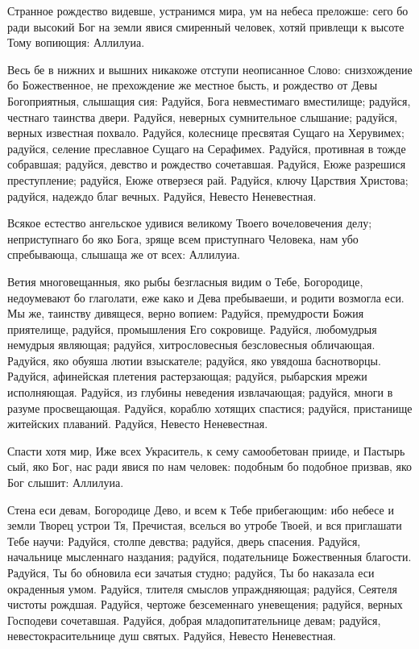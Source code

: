 

Странное рождество видевше, устранимся мира, ум на небеса преложше: сего бо ради высокий Бог на земли явися смиренный человек, хотяй привлещи к высоте Тому вопиющия: Аллилуиа.




Весь бе в нижних и вышних никакоже отступи неописанное Слово: снизхождение бо Божественное, не прехождение же местное бысть, и рождество от Девы Богоприятныя, слышащия сия: Радуйся, Бога невместимаго вместилище; радуйся, честнаго таинства двери. Радуйся, неверных сумнительное слышание; радуйся, верных известная похвало. Радуйся, колеснице пресвятая Сущаго на Херувимех; радуйся, селение преславное Сущаго на Серафимех. Радуйся, противная в тожде собравшая; радуйся, девство и рождество сочетавшая. Радуйся, Еюже разрешися преступление; радуйся, Еюже отверзеся рай. Радуйся, ключу Царствия Христова; радуйся, надеждо благ вечных. Радуйся, Невесто Неневестная.




Всякое естество ангельское удивися великому Твоего вочеловечения делу; неприступнаго бо яко Бога, зряще всем приступнаго Человека, нам убо спребывающа, слышаща же от всех: Аллилуиа.




Ветия многовещанныя, яко рыбы безгласныя видим о Тебе, Богородице, недоумевают бо глаголати, еже како и Дева пребываеши, и родити возмогла еси. Мы же, таинству дивящеся, верно вопием: Радуйся, премудрости Божия приятелище, радуйся, промышления Его сокровище. Радуйся, любомудрыя немудрыя являющая; радуйся, хитрословесныя безсловесныя обличающая. Радуйся, яко обуяша лютии взыскателе; радуйся, яко увядоша баснотворцы. Радуйся, афинейская плетения растерзающая; радуйся, рыбарския мрежи исполняющая. Радуйся, из глубины неведения извлачающая; радуйся, многи в разуме просвещающая. Радуйся, кораблю хотящих спастися; радуйся, пристанище житейских плаваний. Радуйся, Невесто Неневестная.




Спасти хотя мир, Иже всех Украситель, к сему самообетован прииде, и Пастырь сый, яко Бог, нас ради явися по нам человек: подобным бо подобное призвав, яко Бог слышит: Аллилуиа.




Стена еси девам, Богородице Дево, и всем к Тебе прибегающим: ибо небесе и земли Творец устрои Тя, Пречистая, вселься во утробе Твоей, и вся приглашати Тебе научи: Радуйся, столпе девства; радуйся, дверь спасения. Радуйся, начальнице мысленнаго наздания; радуйся, подательнице Божественныя благости. Радуйся, Ты бо обновила еси зачатыя студно; радуйся, Ты бо наказала еси окраденныя умом. Радуйся, тлителя смыслов упраждняющая; радуйся, Сеятеля чистоты рождшая. Радуйся, чертоже безсеменнаго уневещения; радуйся, верных Господеви сочетавшая. Радуйся, добрая младопитательнице девам; радуйся, невестокрасительнице душ святых. Радуйся, Невесто Неневестная.



